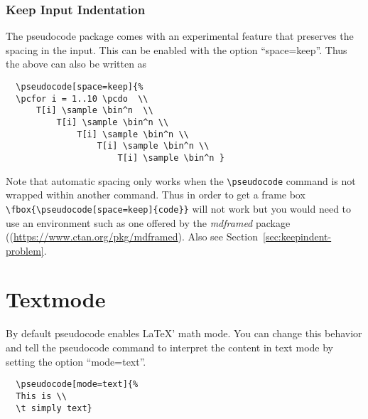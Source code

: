 \documentclass[a4paper]{report}
\begin{document}
  \subsubsection{Keep Input Indentation}
  \label{sec:keepindent}
  The pseudocode package comes with an experimental feature that preserves the spacing in the input. This can be enabled with
  the option \enquote{space=keep}. Thus the above can also be written as
  \begin{center}
  \end{center}
  \begin{lstlisting}
  \pseudocode[space=keep]{%
  \pcfor i = 1..10 \pcdo  \\
	  T[i] \sample \bin^n  \\
		  T[i] \sample \bin^n \\
			  T[i] \sample \bin^n \\
				  T[i] \sample \bin^n \\
					  T[i] \sample \bin^n }
  \end{lstlisting}
  Note that automatic spacing only works when the \lstinline$\pseudocode$ command is not wrapped within another command.
  Thus in order to get a frame box \lstinline$\fbox{\pseudocode[space=keep]{code}}$ will not work but you would need to use
  an environment such as one offered by the \emph{mdframed} package ((\url{https://www.ctan.org/pkg/mdframed}). Also see
  Section~\ref{sec:keepindent-problem}.
  
   
  \section{Textmode}
  
  By default pseudocode enables \LaTeX' math mode. You can change this behavior and tell the pseudocode command to interpret the content
  in text mode by setting the option \enquote{mode=text}.
  \begin{center}
  \end{center}
  \begin{lstlisting}
  \pseudocode[mode=text]{%
  This is \\
  \t simply text}
  \end{lstlisting}
  
\end{document}
